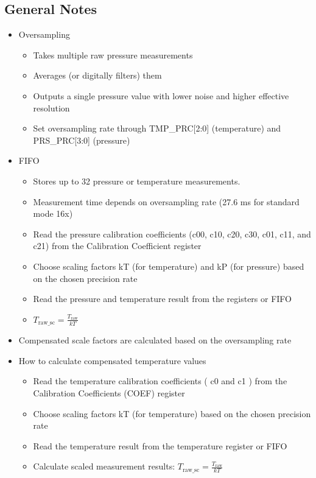 \documentclass{article}
\begin{document}
\subsection{General Notes}
\begin{itemize}
    \item Oversampling
    \begin{itemize}
        \item Takes multiple raw pressure measurements
        \item Averages (or digitally filters) them
        \item Outputs a single pressure value with lower noise and higher effective resolution
        \item Set oversampling rate through TMP\_PRC[2:0] (temperature) and PRS\_PRC[3:0] (pressure)
    \end{itemize}
    \item FIFO
    \begin{itemize}
        \item Stores up to 32 pressure or temperature measurements.
        \item Measurement time depends on oversampling rate (27.6 ms for standard mode 16x)
        \item Read the pressure calibration coefficients (c00, c10, c20, c30, c01, c11, and c21) from the Calibration Coefficient register
        \item Choose scaling factors kT (for temperature) and kP (for pressure) based on the chosen precision rate
        \item Read the pressure and temperature result from the registers or FIFO
        \item $T_{\text{raw\_sc}}=\frac{T_{\text{raw}}}{kT}$
    \end{itemize}
    \item Compensated scale factors are calculated based on the oversampling rate
    \item How to calculate compensated temperature values
    \begin{itemize}
        \item Read the temperature calibration coefficients ( c0 and c1 ) from the Calibration Coefficients (COEF) register
        \item Choose scaling factors kT (for temperature) based on the chosen precision rate
        \item Read the temperature result from the temperature register or FIFO
        \item Calculate scaled measurement results: $T_{\text{raw\_sc}}=\frac{T_{\text{raw}}}{kT}$

\end{itemize}
\end{itemize}
\end{document}
